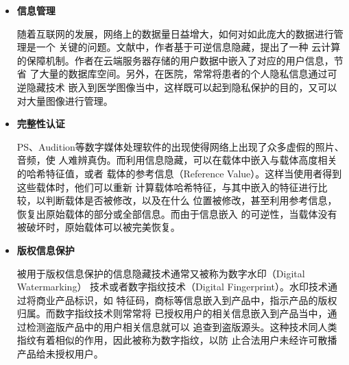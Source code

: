 \begin{itemize}
  \setlength{\parindent}{2em}
  \vspace{-3mm}
  \item \textbf{信息管理}
  \vspace{-2mm}
  \par
  随着互联网的发展，网络上的数据量日益增大，如何对如此庞大的数据进行管理是一个
  关键的问题。文献\cite{hwang2010trusted}中，作者基于可逆信息隐藏，提出了一种
  云计算的保障机制。作者在云端服务器存储的用户数据中嵌入了对应的用户信息，节省
  了大量的数据库空间。另外，在医院，常常将患者的个人隐私信息通过可逆隐藏技术
  嵌入到医学图像当中，这样既可以起到隐私保护的目的，又可以对大量图像进行管理。
  \par
  \vspace{-3mm}
  \item \textbf{完整性认证}
  \vspace{-2mm}
  \par
  PS、Audition等数字媒体处理软件的出现使得网络上出现了众多虚假的照片、音频，使
  人难辨真伪。而利用信息隐藏，可以在载体中嵌入与载体高度相关的哈希特征值，或者
  载体的参考信息（Reference Value）。这样当使用者得到这些载体时，他们可以重新
  计算载体哈希特征，与其中嵌入的特征进行比较，以判断载体是否被修改，以及在什么
  位置被修改，甚至利用参考信息，恢复出原始载体的部分或全部信息。而由于信息嵌入
  的可逆性，当载体没有被破坏时，原始载体可以被完美恢复。
  \par
  \vspace{-3mm}
  \item \textbf{版权信息保护}
  \vspace{-2mm}
  \par
  被用于版权信息保护的信息隐藏技术通常又被称为数字水印（Digital Watermarking）
  技术或者数字指纹技术（Digital Fingerprint）。水印技术通过将商业产品标识，如
  特征码，商标等信息嵌入到产品中，指示产品的版权归属。而数字指纹技术则常常将
  已授权用户的相关信息嵌入到产品当中，通过检测盗版产品中的用户相关信息就可以
  追查到盗版源头。这种技术同人类指纹有着相似的作用，因此被称为数字指纹，以防
  止合法用户未经许可散播产品给未授权用户。\\
\end{itemize}



